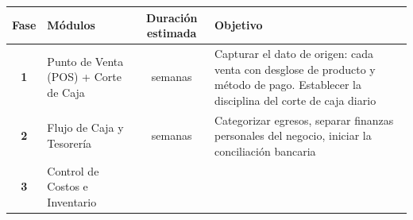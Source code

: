 \documentclass[
  12pt,
  spanish,
]{article}
\begin{document}
\begin{longtable}[]{@{}clcl@{}}
\toprule
\begin{minipage}[b]{0.28\columnwidth}\centering
Fase\strut
\end{minipage} & \begin{minipage}[b]{0.17\columnwidth}\raggedright
Módulos\strut
\end{minipage} & \begin{minipage}[b]{0.28\columnwidth}\centering
Duración estimada\strut
\end{minipage} & \begin{minipage}[b]{0.17\columnwidth}\raggedright
Objetivo\strut
\end{minipage}\tabularnewline
\midrule
\endhead
\begin{minipage}[t]{0.28\columnwidth}\centering
\textbf{1}\strut
\end{minipage} & \begin{minipage}[t]{0.17\columnwidth}\raggedright
Punto de Venta (POS) + Corte de Caja\strut
\end{minipage} & \begin{minipage}[t]{0.28\columnwidth}\centering
4 semanas\strut
\end{minipage} & \begin{minipage}[t]{0.17\columnwidth}\raggedright
Capturar el dato de origen: cada venta con desglose de producto y método
de pago. Establecer la disciplina del corte de caja diario\strut
\end{minipage}\tabularnewline
\begin{minipage}[t]{0.28\columnwidth}\centering
\textbf{2}\strut
\end{minipage} & \begin{minipage}[t]{0.17\columnwidth}\raggedright
Flujo de Caja y Tesorería\strut
\end{minipage} & \begin{minipage}[t]{0.28\columnwidth}\centering
3 semanas\strut
\end{minipage} & \begin{minipage}[t]{0.17\columnwidth}\raggedright
Categorizar egresos, separar finanzas personales del negocio, iniciar la
conciliación bancaria\strut
\end{minipage}\tabularnewline
\begin{minipage}[t]{0.28\columnwidth}\centering
\textbf{3}\strut
\end{minipage} & \begin{minipage}[t]{0.17\columnwidth}\raggedright
Control de Costos e Inventario\strut

\end{minipage}
\end{longtable}
\end{document}
